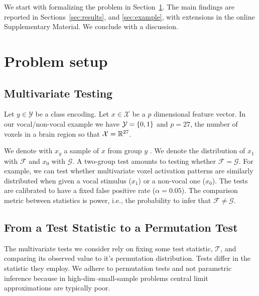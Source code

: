 \documentclass[oupdraft]{bio}
\begin{document}
We start with formalizing the problem in Section~\ref{sec:problem_setup}.
The main findings are reported in Sections~\ref{sec:results}, and \ref{sec:example}, with extensions in the online Supplementary Material. 
We conclude with a discussion.







\section{Problem setup}
\label{sec:problem_setup}


\subsection{Multivariate Testing}

Let $y \in \mathcal{Y}$ be a class encoding. 
Let $x \in \mathcal{X}$ be a $p$ dimensional feature vector. 
In our vocal/non-vocal example we have $\mathcal{Y}=\{ 0,1 \}$ and $p=27$, the number of voxels in a brain region so that $\mathcal{X}=\mathbb{R}^{27}$. 

We denote with $x_y$ a sample of $x$ from group $y$ .
We denote the distribution of $x_1$ with $\mathcal{F}$ and $x_0$ with $\mathcal{G}$.
A two-group test amounts to testing whether $\mathcal{F}=\mathcal{G}$.
For example, we can test whether multivariate voxel activation patterns are similarly distributed when given a vocal stimulus ($x_1$) or a non-vocal one ($x_0$).
The tests are calibrated to have a fixed false positive rate ($\alpha=0.05$).
The comparison metric between statistics is power, i.e., the probability to infer that $\mathcal{F}\neq\mathcal{G}$.


\subsection{From a Test Statistic to a Permutation Test}

The multivariate tests we consider rely on fixing some test statistic, $\mathcal{T}$, and comparing its observed value to it's permutation distribution. 
Tests differ in the statistic they employ.
We adhere to permutation tests and not parametric inference because in high-dim--small-sample problems central limit approximations are typically poor.
\end{document}
